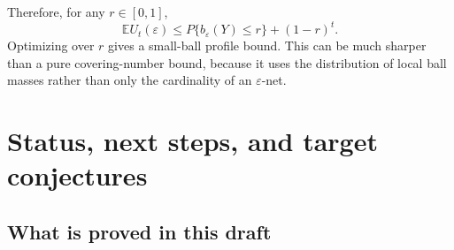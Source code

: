 \documentclass[11pt]{article}
\theoremstyle{definition}
\newcommand{\E}{\mathbb E}
\begin{document}
Therefore, for any $r\in[0,1]$,
\[
  \E U_t(\varepsilon)
  \le P\{b_\varepsilon(Y)\le r\}+(1-r)^t.
\]
Optimizing over $r$ gives a small-ball profile bound. This can be much sharper than a pure covering-number bound, because it uses the distribution of local ball masses rather than only the cardinality of an $\varepsilon$-net.




\section{Status, next steps, and target conjectures}


\subsection{What is proved in this draft}
\end{document}
